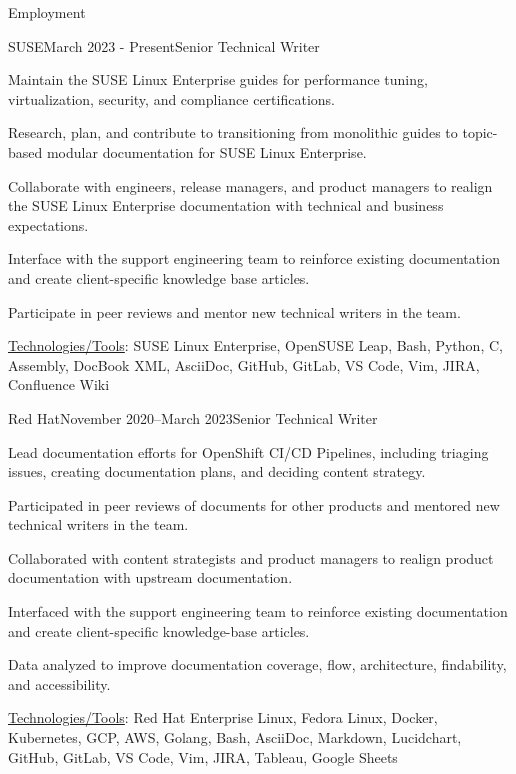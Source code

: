 \documentclass{resume} %
\begin{document}
\begin{rSection}{Employment}

\begin{rSubsection}{SUSE}{March 2023 - Present}{Senior Technical Writer}{}
\item Maintain the SUSE Linux Enterprise guides for performance tuning, virtualization, security, and compliance certifications.
\item Research, plan, and contribute to transitioning from monolithic guides to topic-based modular documentation for SUSE Linux Enterprise.
\item Collaborate with engineers, release managers, and product managers to realign the SUSE Linux Enterprise documentation with technical and business expectations.
\item Interface with the support engineering team to reinforce existing documentation and create client-specific knowledge base articles.
\item Participate in peer reviews and mentor new technical writers in the team. 
\item \underline{Technologies/Tools}: SUSE Linux Enterprise, OpenSUSE Leap, Bash, Python, C, Assembly, DocBook XML, AsciiDoc, GitHub, GitLab, VS Code, Vim, JIRA, Confluence Wiki 
\end{rSubsection}


\begin{rSubsection}{Red Hat}{November 2020–March 2023}{Senior Technical Writer}{}
\item Lead documentation efforts for OpenShift CI/CD Pipelines, including triaging issues, creating documentation plans, and deciding content strategy.
\item Participated in peer reviews of documents for other products and mentored new technical writers in the team. 
\item Collaborated with content strategists and product managers to realign product documentation with upstream documentation.
\item Interfaced with the support engineering team to reinforce existing documentation and create client-specific knowledge-base articles.
\item Data analyzed to improve documentation coverage, flow, architecture, findability, and accessibility. 
\item \underline{Technologies/Tools}: Red Hat Enterprise Linux, Fedora Linux, Docker, Kubernetes, GCP, AWS, Golang, Bash, AsciiDoc, Markdown, Lucidchart, GitHub, GitLab, VS Code, Vim, JIRA, Tableau, Google Sheets 
\end{rSubsection}


\end{rSection}
\end{document}
